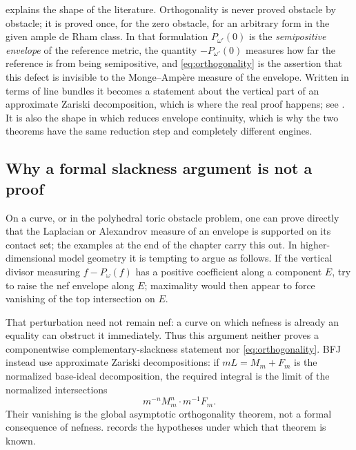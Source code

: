\begin{remark}
\label{rem:ch27-zero-obstacle}
 explains the shape of the
literature.  Orthogonality is never proved obstacle by obstacle; it is
proved once, for the zero obstacle, for an arbitrary form in the given
ample de Rham class.  In that formulation \(P_{\omega'}(0)\) is the
\emph{semipositive envelope} of the reference metric, the quantity
\(-P_{\omega'}(0)\) measures how far the reference is from being
semipositive, and \eqref{eq:orthogonality} is the assertion that this defect
is invisible to the Monge--Amp\`ere measure of the envelope.  Written in
terms of line bundles it becomes a statement about the vertical part of an
approximate Zariski decomposition, which is where the real proof happens;
see .  It is also the shape in which
 reduces envelope continuity, which
is why the two theorems have the same reduction step and completely
different engines.
\end{remark}

\subsection{Why a formal slackness argument is not a proof}
\label{sec:ch27-orthogonality-heuristic}

\begin{remark}
\label{rem:model-slackness-heuristic}
On a curve, or in the polyhedral toric obstacle problem, one can prove
directly that the Laplacian or Alexandrov measure of an envelope is supported
on its contact set; the examples at the end of the chapter carry this out.
In higher-dimensional model geometry it is tempting to argue as follows.  If
the vertical divisor measuring \(f-P_\omega(f)\) has a positive coefficient
along a component \(E\), try to raise the nef envelope along \(E\); maximality
would then appear to force vanishing of the top intersection on \(E\).

That perturbation need not remain nef: a curve on which nefness is already
an equality can obstruct it immediately.  Thus this argument neither proves
a componentwise complementary-slackness statement nor
\eqref{eq:orthogonality}.  BFJ instead use approximate Zariski decompositions:
if \(mL=M_m+F_m\) is the normalized base-ideal decomposition, the required
integral is the limit of the normalized intersections
\[
                  m^{-n}M_m^n\cdot m^{-1}F_m.
\]
Their vanishing is the global asymptotic orthogonality theorem, not a formal
consequence of nefness.   records
the hypotheses under which that theorem is known.
\end{remark}

